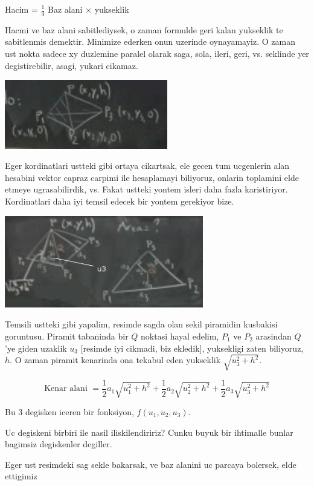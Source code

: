\documentclass[12pt,fleqn]{article}
\begin{document}
Hacim = $\frac{1}{3}$ Baz alani $\times$ yukseklik

Hacmi ve baz alani sabitlediysek, o zaman formulde geri kalan yukseklik te
sabitlenmis demektir. Minimize ederken onun uzerinde oynayamayiz. O zaman
ust nokta sadece xy duzlemine paralel olarak saga, sola, ileri, geri,
vs. seklinde yer degistirebilir, asagi, yukari cikamaz. 

\includegraphics[height=3cm]{13_9.png}

Eger kordinatlari ustteki gibi ortaya cikartsak, ele gecen tum ucgenlerin
alan hesabini vektor capraz carpimi ile hesaplamayi biliyoruz, onlarin
toplamini elde etmeye ugrasabilirdik, vs. Fakat ustteki yontem isleri daha
fazla karistiriyor. Kordinatlari daha iyi temsil edecek bir yontem
gerekiyor bize.

\includegraphics[height=4cm]{13_10.png}

Temsili ustteki gibi yapalim, resimde sagda olan sekil piramidin kusbakisi
goruntusu. Piramit tabaninda bir $Q$ noktasi hayal edelim, $P_1$  ve $P_2$
arasindan $Q$'ye giden uzaklik $u_3$ [resimde iyi cikmadi, biz ekledik],
yuksekligi zaten biliyoruz, $h$. O zaman piramit kenarinda ona tekabul eden
yukseklik $\sqrt{u_3^2 + h^2}$. 

\[ \textrm{Kenar alani } = 
\frac{1}{2}a_1 \sqrt{u_1^2 + h^2} + 
\frac{1}{2}a_2 \sqrt{u_2^2 + h^2} + 
\frac{1}{2}a_3 \sqrt{u_3^2 + h^2} 
 \]

Bu 3 degisken iceren bir fonksiyon, $f(u_1,u_2,u_3)$. 

Uc degiskeni birbiri ile nasil iliskilendiririz? Cunku buyuk bir ihtimalle
bunlar bagimsiz degiskenler degiller.

Eger ust resimdeki sag sekle bakarsak, ve baz alanini uc parcaya bolersek,
elde ettigimiz
\end{document}
